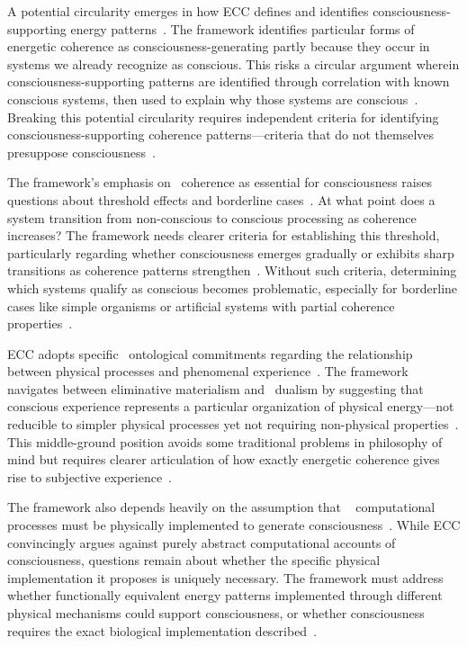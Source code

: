 A potential circularity emerges in how ECC defines and identifies consciousness-supporting energy patterns~\cite{noe2009out}. The framework identifies particular forms of energetic coherence as consciousness-generating partly because they occur in systems we already recognize as conscious. This risks a circular argument wherein consciousness-supporting patterns are identified through correlation with known conscious systems, then used to explain why those systems are conscious~\cite{pigliucci2013philosophy}. Breaking this potential circularity requires independent criteria for identifying consciousness-supporting coherence patterns—criteria that do not themselves presuppose consciousness~\cite{thompson2010mind, deacon2013incomplete}.

The framework's emphasis on~ coherence as essential for consciousness raises questions about threshold effects and borderline cases~\cite{goff2019galileo}. At what point does a system transition from non-conscious to conscious processing as coherence increases? The framework needs clearer criteria for establishing this threshold, particularly regarding whether consciousness emerges gradually or exhibits sharp transitions as coherence patterns strengthen~\cite{tononi2016integrated, rovelli2018order}. Without such criteria, determining which systems qualify as conscious becomes problematic, especially for borderline cases like simple organisms or artificial systems with partial coherence properties~\cite{feinberg2016ancient}.

ECC adopts specific~ ontological commitments regarding the relationship between physical processes and phenomenal experience~\cite{merleau2012phenomenology}. The framework navigates between eliminative materialism and~ dualism by suggesting that conscious experience represents a particular organization of physical energy—not reducible to simpler physical processes yet not requiring non-physical properties~\cite{koch2019feeling}. This middle-ground position avoids some traditional problems in philosophy of mind but requires clearer articulation of how exactly energetic coherence gives rise to subjective experience~\cite{zahavi2014self, bateson2002mind}.

The framework also depends heavily on the assumption that ~ computational processes must be physically implemented to generate consciousness~\cite{thompson2014waking}. While ECC convincingly argues against purely abstract computational accounts of consciousness, questions remain about whether the specific physical implementation it proposes is uniquely necessary. The framework must address whether functionally equivalent energy patterns implemented through different physical mechanisms could support consciousness, or whether consciousness requires the exact biological implementation described~\cite{chalmers2010character, penrose2016fashion}.

